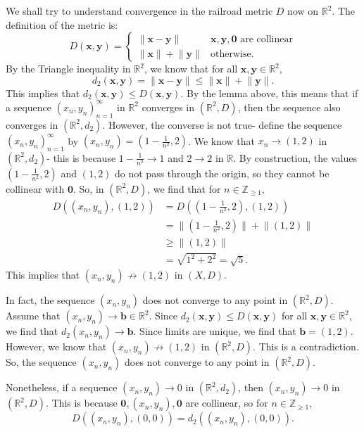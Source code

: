 \documentclass[a4paper, openany]{memoir}
\theoremstyle{definition}
\theoremstyle{plain}
\begin{document}
We shall try to understand convergence in the railroad metric $D$ now on $\mathbb{R}^2$. The definition of the metric is:
\[D(\bm{x}, \bm{y}) = \begin{cases}
\lVert \bm{x} - \bm{y} \rVert & \bm{x}, \bm{y}, \bm{0} \text{ are collinear} \\
\lVert \bm{x} \rVert + \lVert \bm{y} \rVert & \text{otherwise}.
\end{cases}\]
By the Triangle inequality in $\mathbb{R}^2$, we know that for all $\bm{x}, \bm{y} \in \mathbb{R}^2$,
\[d_2(\bm{x}, \bm{y}) = \lVert \bm{x} - \bm{y} \rVert \leqslant \lVert \bm{x} \rVert + \lVert \bm{y} \rVert.\]
This implies that $d_2(\bm{x}, \bm{y}) \leqslant D(\bm{x}, \bm{y})$. By the lemma above, this means that if a sequence $(x_n, y_n)_{n=1}^{\infty}$ in $\mathbb{R}^2$ converges in $(\mathbb{R}^2, D)$, then the  sequence also converges in $(\mathbb{R}^2, d_2)$. However, the converse is not true- define the sequence $(x_n, y_n)_{n=1}^{\infty}$ by $(x_n, y_n) = (1 - \frac{1}{n^2}, 2)$. We know that $x_n \to (1, 2)$ in $(\mathbb{R}^2, d_2)$- this is because $1 - \frac{1}{n^2} \to 1$ and $2 \to 2$ in $\mathbb{R}$. By construction, the values $(1 - \frac{1}{n^2}, 2)$ and $(1, 2)$ do not pass through the origin, so they cannot be collinear with $\bm{0}$. So, in $(\mathbb{R}^2, D)$, we find that for $n \in \mathbb{Z}_{\geqslant 1}$,
\begin{align*}
    D((x_n, y_n), (1, 2)) &= D((1 - \tfrac{1}{n^2}, 2), (1, 2)) \\
    &= \lVert (1 - \tfrac{1}{n^2}, 2) \rVert + \lVert (1, 2) \rVert \\
    &\geqslant \lVert (1, 2) \rVert \\
    &= \sqrt{1^2 + 2^2} = \sqrt{5}.
\end{align*}
This implies that $(x_n, y_n) \not\to (1, 2)$ in $(X, D)$. 

In fact, the sequence $(x_n, y_n)$ does not converge to any point in $(\mathbb{R}^2, D)$. Assume that $(x_n, y_n) \to \bm{b} \in \mathbb{R}^2$. Since $d_2(\bm{x}, \bm{y}) \leqslant D(\bm{x}, \bm{y})$ for all $\bm{x}, \bm{y} \in \mathbb{R}^2$, we find that $d_2(x_n, y_n) \to \bm{b}$. Since limits are unique, we find that $\bm{b} = (1, 2)$. However, we know that $(x_n, y_n) \not\to (1, 2)$ in $(\mathbb{R}^2, D)$. This is a contradiction. So, the sequence $(x_n, y_n)$ does not converge to any point in $(\mathbb{R}^2, D)$.

Nonetheless, if a sequence $(x_n, y_n) \to 0$ in $(\mathbb{R}^2, d_2)$, then $(x_n, y_n) \to 0$ in $(\mathbb{R}^2, D)$. This is because $\bm{0}, (x_n, y_n), \bm{0}$ are collinear, so for $n \in \mathbb{Z}_{\geqslant 1}$, 
\[D((x_n, y_n), (0, 0)) = d_2((x_n, y_n), (0, 0)).\]
\end{document}
